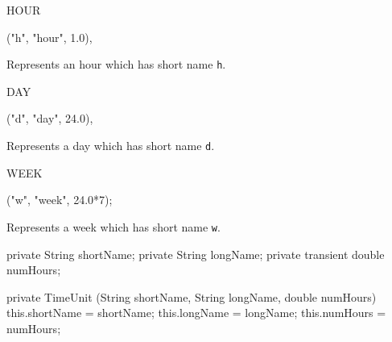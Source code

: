 \begin{code}

   HOUR\begin{hide}

("h", "hour", 1.0),
\end{hide}
\end{code}
\begin{tabb}   Represents an hour which has short name \texttt{h}.
\end{tabb}
\begin{code}

   DAY\begin{hide}

("d", "day", 24.0),
\end{hide}
\end{code}
\begin{tabb}   Represents a day which has short name \texttt{d}.
\end{tabb}
\begin{code}

   WEEK\begin{hide}

("w", "week", 24.0*7);
\end{hide}
\end{code}
\begin{tabb}   Represents a week which has short name \texttt{w}.
\end{tabb}
\begin{code}\begin{hide}

   private String shortName;
   private String longName;
   private transient double numHours;

   private TimeUnit (String shortName, String longName, double numHours) {
      this.shortName = shortName;
      this.longName = longName;
      this.numHours = numHours;
   }\end{hide}
\end{code}

